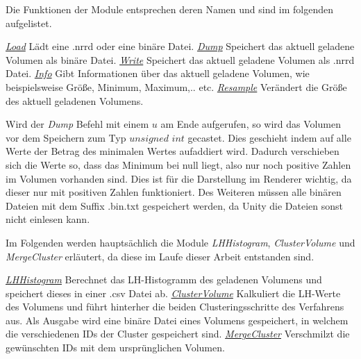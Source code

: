 Die Funktionen der Module entsprechen deren Namen und sind im folgenden aufgelistet.


\underline{\textit{Load}}
\newline
Lädt eine .nrrd oder eine binäre Datei.
\newline
\underline{\textit{Dump}}
\newline
Speichert das aktuell geladene Volumen als binäre Datei.
\newline
\underline{\textit{Write}}
\newline
Speichert das aktuell geladene Volumen als .nrrd Datei.
\newline
\underline{\textit{Info}}
\newline
Gibt Informationen über das aktuell geladene Volumen, wie beispielsweise Größe, Minimum, Maximum,.. etc.
\newline
\underline{\textit{Resample}}
\newline
Verändert die Größe des aktuell geladenen Volumens.


Wird der \textit{Dump} Befehl mit einem $u$ am Ende aufgerufen, so wird das Volumen vor dem Speichern zum Typ $unsigned$ $int$ gecastet. Dies geschieht indem auf alle Werte der Betrag des minimalen Wertes aufaddiert wird. Dadurch verschieben sich die Werte so, dass das Minimum bei null liegt, also nur noch positive Zahlen im Volumen vorhanden sind. Dies ist für die Darstellung im Renderer wichtig, da dieser nur mit positiven Zahlen funktioniert. Des Weiteren müssen alle binären Dateien mit dem Suffix .bin.txt gespeichert werden, da Unity die Dateien sonst nicht einlesen kann.


Im Folgenden werden hauptsächlich die Module \textit{LHHistogram}, \textit{ClusterVolume} und \textit{MergeCluster} erläutert, da diese im Laufe dieser Arbeit entstanden sind.


\underline{\textit{LHHistogram}}
\newline
 Berechnet das LH-Histogramm des geladenen Volumens und speichert dieses in einer .csv Datei ab.
\newline
\underline{\textit{ClusterVolume}}
\newline
Kalkuliert die LH-Werte des Volumens und führt hinterher die beiden Clusteringsschritte des Verfahrens aus. Als Ausgabe wird eine binäre Datei eines Volumens gespeichert, in welchem die verschiedenen IDs der Cluster gespeichert sind.
\newline
\underline{\textit{MergeCluster}}
\newline
Verschmilzt die gewünschten IDs mit dem ursprünglichen Volumen.

